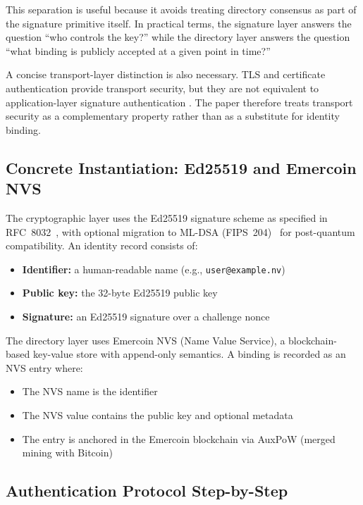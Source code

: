 \documentclass[11pt,a4paper]{article}
\begin{document}
This separation is useful because it avoids treating directory consensus as part of the signature primitive itself. In practical terms, the signature layer answers the question ``who controls the key?'' while the directory layer answers the question ``what binding is publicly accepted at a given point in time?''

A concise transport-layer distinction is also necessary. TLS and certificate authentication provide transport security, but they are not equivalent to application-layer signature authentication \cite{rfc5280,cerf1974}. The paper therefore treats transport security as a complementary property rather than as a substitute for identity binding.

\subsection{Concrete Instantiation: Ed25519 and Emercoin NVS}

The cryptographic layer uses the Ed25519 signature scheme as specified in RFC~8032~\cite{rfc8032}, with optional migration to ML-DSA (FIPS~204)~\cite{fips204} for post-quantum compatibility. An identity record consists of:

\begin{itemize}[leftmargin=*]
  \item \textbf{Identifier:} a human-readable name (e.g., \texttt{user@example.nv})
  \item \textbf{Public key:} the 32-byte Ed25519 public key
  \item \textbf{Signature:} an Ed25519 signature over a challenge nonce
\end{itemize}

The directory layer uses Emercoin NVS (Name Value Service), a blockchain-based key-value store with append-only semantics. A binding is recorded as an NVS entry where:
\begin{itemize}[leftmargin=*]
  \item The NVS name is the identifier
  \item The NVS value contains the public key and optional metadata
  \item The entry is anchored in the Emercoin blockchain via AuxPoW (merged mining with Bitcoin)
\end{itemize}

\subsection{Authentication Protocol Step-by-Step}
\end{document}
